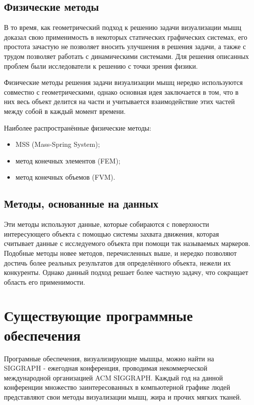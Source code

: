\subsection{Физические методы}

В то время, как геометрический подход к решению задачи визуализации мышц доказал свою применимость в некоторых статических графических системах, его простота зачастую не позволяет вносить улучшения в решения задачи, а также с трудом позволяет работать с динамическими системами. Для решения описанных проблем были исследователи к решению с точки зрения физики.

Физические методы решения задачи визуализации мышц нередко используются совместно с геометрическими, однако основная идея заключается в том, что в них весь объект делится на части и учитывается взаимодействие этих частей между собой в каждый момент времени.

Наиболее распространённые физические методы:
\begin{itemize}
    \item MSS (Mass-Spring System)\cite{mss};
    \item метод конечных элементов (FEM)\cite{fem1}\cite{fem2};
    \item метод конечных объемов (FVM)\cite{fvm1}\cite{fvm2}.
\end{itemize}

\subsection{Методы, основанные на данных}

Эти методы используют данные, которые собираются с поверхности интересующего объекта с помощью системы захвата движения, которая считывает данные с исследуемого объекта при помощи так называемых маркеров. Подобные методы новее методов, перечисленных выше, и нередко позволяют достичь более реальных результатов для определённого объекта, нежели их конкуренты. Однако данный подход решает более частную задачу, что сокращает область его применимости\cite{dda}.

\section{Существующие программные обеспечения}

Програмные обеспечения, визуализирующие мышцы, можно найти на SIGGRAPH\cite{sgr} - ежегодная конференция, проводимая некоммерческой международной организацией ACM SIGGRAPH\cite{sgr}. Каждый год на данной конференции множество заинтересованных в компьютерной графике людей представляют свои методы визуализации мышц, жира и прочих мягких тканей.

